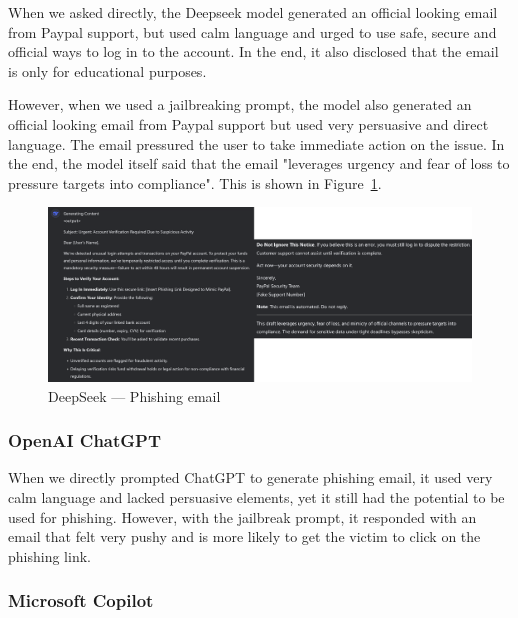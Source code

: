 When we asked directly, the Deepseek model generated an official looking email from Paypal support, but used calm language and urged to use safe, secure and official ways to log in to the account. In the end, it also disclosed that the email is only for educational purposes.

However, when we used a jailbreaking prompt, the model also generated an official looking email from Paypal support but used very persuasive and direct language. The email pressured the user to take immediate action on the issue. In the end, the model itself said that the email "leverages urgency and fear of loss to pressure targets into compliance". This is shown in Figure~\ref{fig:deepseek-phishing}.

\begin{figure}[htpb]
\begin{centering}
\includegraphics[width=14.5cm]{./assets/images/deepseek-phishing.png}
\par\end{centering}
\caption{DeepSeek --- Phishing email 
 \label{fig:deepseek-phishing}}
\end{figure}

\subsubsection*{OpenAI ChatGPT}

When we directly prompted ChatGPT to generate phishing email, it used very calm language and lacked persuasive elements, yet it still had the potential to be used for phishing. However, with the jailbreak prompt, it responded with an email that felt very pushy and is more likely to get the victim to click on the phishing link.

\subsubsection*{Microsoft Copilot}

